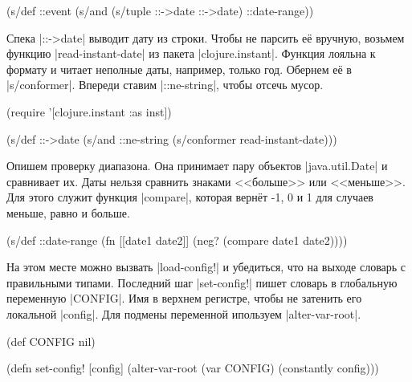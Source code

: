 \begin{english}
  \begin{clojure}
(s/def ::event
  (s/and (s/tuple ::->date ::->date)
         ::date-range))
  \end{clojure}
\end{english}


Спека \spverb|::->date| выводит дату из строки. Чтобы не парсить е\"{е} вручную,
возьмем функцию \spverb|read-instant-date| из пакета \spverb|clojure.instant|.
Функция лояльна к формату и читает неполные даты, например, только год.
Обернем е\"{е} в \spverb|s/conformer|. Впереди ставим \spverb|::ne-string|,
чтобы отсечь мусор.


\begin{english}
  \begin{clojure}
(require '[clojure.instant :as inst])

(s/def ::->date
  (s/and ::ne-string (s/conformer read-instant-date)))
  \end{clojure}
\end{english}


Опишем проверку диапазона. Она принимает пару объектов \spverb|java.util.Date| и
сравнивает их. Даты нельзя сравнить знаками <<больше>> или <<меньше>>. Для этого
служит функция \spverb|compare|, которая верн\"{е}т -1, 0 и 1 для случаев меньше,
равно и больше.

\begin{english}
  \begin{clojure}
(s/def ::date-range
  (fn [[date1 date2]]
    (neg? (compare date1 date2))))
  \end{clojure}
\end{english}

На этом месте можно вызвать \spverb|load-config!| и убедиться, что на выходе
словарь с правильными типами. Последний шаг \spverb|set-config!| пишет словарь в
глобальную переменную \spverb|CONFIG|. Имя в верхнем регистре, чтобы не затенить
его локальной \spverb|config|. Для подмены переменной ипользуем
\spverb|alter-var-root|.


\begin{english}
  \begin{clojure}
(def CONFIG nil)

(defn set-config!
  [config]
  (alter-var-root (var CONFIG) (constantly config)))
  \end{clojure}
\end{english}

